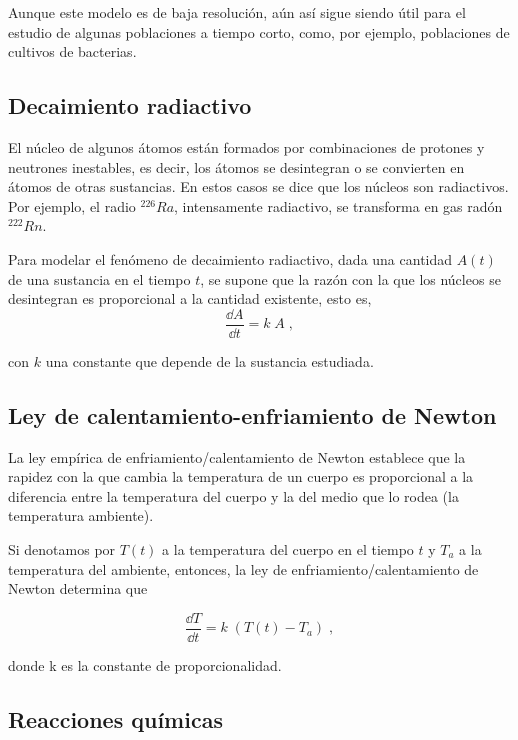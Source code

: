 Aunque este modelo es de baja resolución, aún así sigue siendo útil para el estudio de algunas poblaciones a tiempo corto, como, por ejemplo, poblaciones de cultivos de bacterias. 


\subsection{Decaimiento radiactivo}    


El núcleo de algunos átomos están formados por combinaciones de protones y neutrones inestables, es decir, los átomos se desintegran o se convierten en átomos de otras sustancias. En estos casos se dice que los núcleos son radiactivos. Por ejemplo, el radio $^{ 226 }{ Ra }$, intensamente radiactivo, se transforma en gas radón $^{ 222 }{ Rn }$.
 
Para modelar el fenómeno de decaimiento radiactivo, dada una cantidad $A(t)$ de una sustancia en el tiempo $t$, se supone que la razón con la que los núcleos se desintegran es proporcional a la cantidad existente, esto es, 
\begin{equation*}
	\dfrac {\dd A}{\dd t}= k\; A\; ,
\end{equation*}

con $k$ una constante que depende de la sustancia estudiada. 

\subsection{Ley de calentamiento-enfriamiento de Newton}
  
La ley empírica de enfriamiento/calentamiento de Newton establece que la rapidez con la que cambia la temperatura de un cuerpo es proporcional a la diferencia entre la temperatura del cuerpo y la del medio que lo rodea (la temperatura ambiente). 
 
Si denotamos por $T(t)$ a la temperatura del cuerpo en el tiempo $t$ y $T_a$ a la temperatura del ambiente, entonces, la ley de enfriamiento/calentamiento de Newton determina que 
  
  \begin{equation*}
  	\dfrac {\dd T}{\dd t}= k\; \left( T(t)-T_a \right)\; ,
  \end{equation*}
  
donde k es la constante de proporcionalidad. 

\subsection{Reacciones químicas} 
  
